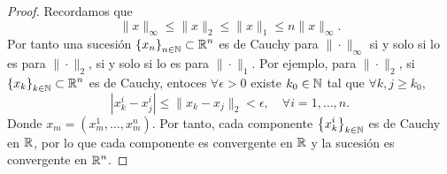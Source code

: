 \begin{proof}
Recordamos que 
\[\| x \|_{\infty} \leq \| x \|_{2} \leq \| x \|_{1} \leq n \|x\|_{\infty}.\]
Por tanto una sucesión $\displaystyle \left\{ x_{n}\right\} _{n\in\mathbb{N}} \subset \mathbb{R}^{n} $ es de Cauchy para $\displaystyle \| \cdot \|_{\infty} $ si y solo si lo es para $\displaystyle \| \cdot \|_{2} $, si y solo si lo es para $\displaystyle \| \cdot \|_{1} $. Por ejemplo, para $\displaystyle \| \cdot \|_{2} $, si $\displaystyle \left\{ x_{k}\right\} _{k\in\mathbb{N}} \subset \mathbb{R}^{n} $ es de Cauchy, entoces $\displaystyle \forall \epsilon > 0 $ existe $\displaystyle k_{0} \in \mathbb{N} $ tal que $\displaystyle \forall k,j \geq k_{0} $, 
\[ \left|x^{i}_{k}-x^{i}_{j}\right| \leq \| x_{k}-x_{j}\|_{2} < \epsilon, \quad \forall i = 1, \ldots, n.\]
Donde $\displaystyle x_{m} = \left(x^{1}_{m}, \ldots, x^{n}_{m}\right) $. Por tanto, cada componente $\displaystyle \left\{ x^{i}_{k}\right\} _{k\in \mathbb{N}} $ es de Cauchy en $\displaystyle \mathbb{R} $, por lo que cada componente es convergente en $\displaystyle \mathbb{R} $ y la sucesión es convergente en $\displaystyle \mathbb{R}^{n} $.
\end{proof}
